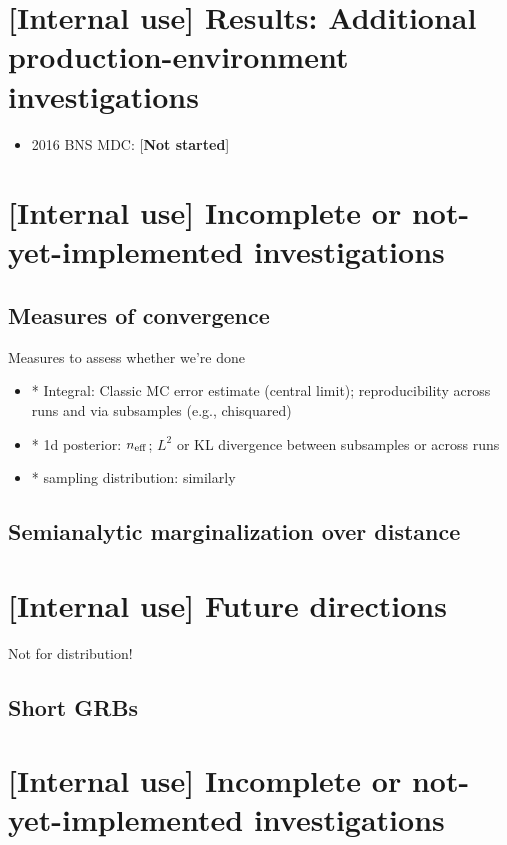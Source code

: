 \section{[Internal use] Results: Additional production-environment investigations}

\begin{itemize}
\item 2016 BNS MDC: [\textbf{Not started}]

\end{itemize}

\section{[Internal use] Incomplete or not-yet-implemented investigations}

\subsection{Measures of convergence}

Measures to assess whether we're done
\begin{itemize}
\item * Integral: Classic MC error estimate (central limit); reproducibility across runs and via subsamples (e.g., chisquared)

\item * 1d posterior:  $n_{\rm eff}$; $L^2$ or KL divergence between subsamples or across runs

\item * sampling distribution: similarly
\end{itemize}


\subsection{Semianalytic marginalization over distance}


\section{[Internal use] Future directions}

Not for distribution!

\subsection{Short GRBs}


\section{[Internal use] Incomplete or not-yet-implemented investigations}

